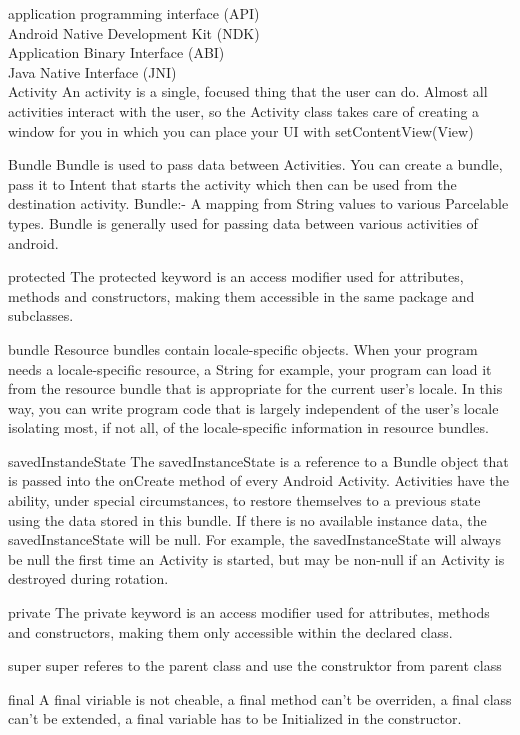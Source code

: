 \documentclass[a4paper,12pt]{article}
\begin{document}
application programming interface (API)\\
Android Native Development Kit (NDK) \\
Application Binary Interface (ABI) \\
Java Native Interface (JNI) \\

Activity
An activity is a single, focused thing that the user can do.
Almost all activities interact with the user, so the Activity class takes care of creating a window for you in which you can place your UI with setContentView(View)

Bundle
Bundle is used to pass data between Activities.
You can create a bundle, pass it to Intent that starts the activity which then can be used from the destination activity.
Bundle:- A mapping from String values to various Parcelable types. Bundle is generally used for passing data between various activities of android.


protected
The protected keyword is an access modifier used for attributes, methods and constructors, 
making them accessible in the same package and subclasses.

bundle
Resource bundles contain locale-specific objects.
 When your program needs a locale-specific resource, a String for example,
 your program can load it from the resource bundle that is appropriate for the current user's locale. In this way, 
you can write program code that is largely independent of the user's locale isolating most, if not all, 
of the locale-specific information in resource bundles.

savedInstandeState
The savedInstanceState is a reference to a Bundle object that is passed into the onCreate method of every Android Activity.
 Activities have the ability, under special circumstances, 
to restore themselves to a previous state using the data stored in this bundle.
 If there is no available instance data, the savedInstanceState will be null. For example, 
the savedInstanceState will always be null the first time an Activity is started, but may be non-null if an Activity is destroyed during rotation.

private
The private keyword is an access modifier used for attributes,
 methods and constructors, 
making them only accessible within the declared class.

super
super referes to the parent class and use the construktor from parent class

final
A final viriable is not cheable, a final method can't be overriden, a final class can't be extended, 
a final variable has to be Initialized in the constructor.
\end{document}
